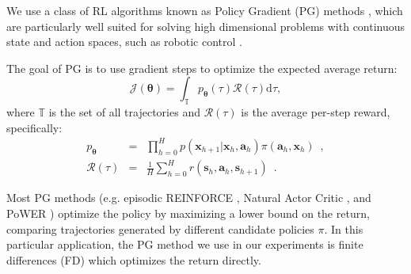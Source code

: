 \documentclass{aamas2016}
\begin{document}
We use a class of RL algorithms known as Policy Gradient (PG) methods \cite{sutton1999policy}, which are particularly well suited for solving high dimensional problems with continuous state and action spaces, such as robotic control \cite{peters2008natural}. %

The goal of PG is to use gradient steps to optimize the expected average return:
\begin{equation}
 \mathcal{J}(\boldsymbol{\theta})=\int_{\mathbb{T}}p_{\boldsymbol{\theta}}(\tau)\mathcal{R}(\tau)\mbox{d}\tau,
 \label{retPG}
\end{equation}
where $\mathbb{T}$ is the set of all trajectories and $\mathcal{R}(\tau)$ is the average per-step reward, specifically:
\begin{eqnarray}
 p_{\boldsymbol{\theta}} & = & \prod_{h=0}^{H}p(\mathbf{x}_{h+1}|\mathbf{x}_{h},\mathbf{a}_{h})\pi(\mathbf{a}_{h},\mathbf{x}_{h})  \enspace, \nonumber \\
 \mathcal{R}(\tau) & = & \frac{1}{H}\sum_{h=0}^{H} r(\mathbf{s}_{h},\mathbf{a}_{h},\mathbf{s}_{h+1})  \enspace. \nonumber
\end{eqnarray}

Most PG methods (e.g. episodic REINFORCE \cite{williams1992simple}, Natural Actor 
Critic \cite{peters2008natural}, and PoWER \cite{kober2009policy}) optimize the policy by maximizing a lower bound on the return, 
comparing trajectories generated by different candidate policies $\pi$. 
In this particular application, the PG method we use in our experiments is finite differences (FD) \cite{Bagnell-2013} 
which optimizes the return directly.
\end{document}
